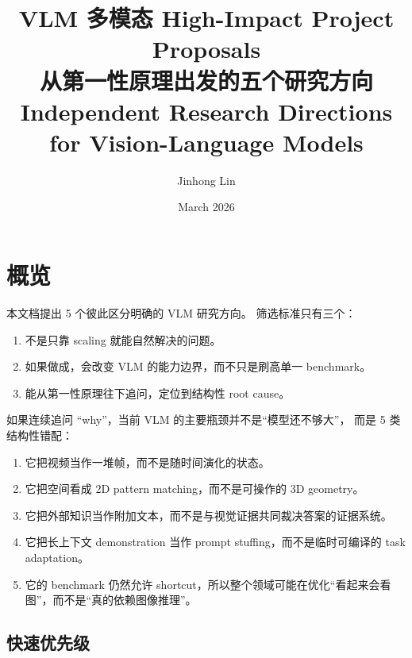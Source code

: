 \documentclass[12pt,a4paper]{article}
\title{\textbf{VLM 多模态 High-Impact Project Proposals}\\
\large{从第一性原理出发的五个研究方向}\\[6pt]
\normalsize{Independent Research Directions for Vision-Language Models}}
\author{Jinhong Lin}
\date{March 2026}
\begin{document}
\maketitle

\section*{概览}

本文档提出 5 个彼此区分明确的 VLM 研究方向。
筛选标准只有三个：
\begin{enumerate}[leftmargin=2em]
  \item 不是只靠 scaling 就能自然解决的问题。
  \item 如果做成，会改变 VLM 的能力边界，而不只是刷高单一 benchmark。
  \item 能从第一性原理往下追问，定位到结构性 root cause。
\end{enumerate}

\begin{insightbox}
如果连续追问 ``why''，当前 VLM 的主要瓶颈并不是``模型还不够大''，
而是 5 类结构性错配：
\begin{enumerate}[leftmargin=2em]
  \item 它把视频当作一堆帧，而不是随时间演化的状态。
  \item 它把空间看成 2D pattern matching，而不是可操作的 3D geometry。
  \item 它把外部知识当作附加文本，而不是与视觉证据共同裁决答案的证据系统。
  \item 它把长上下文 demonstration 当作 prompt stuffing，而不是临时可编译的 task adaptation。
  \item 它的 benchmark 仍然允许 shortcut，所以整个领域可能在优化``看起来会看图''，而不是``真的依赖图像推理''。
\end{enumerate}
\end{insightbox}

\subsection*{快速优先级}
\end{document}
